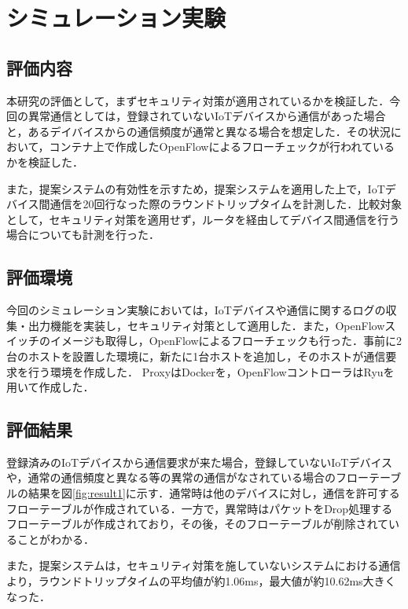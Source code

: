\documentclass[a4paper,10pt,twocolumn,uplatex]{jsarticle}
\begin{document}
\section{シミュレーション実験}

\subsection{評価内容}
本研究の評価として，まずセキュリティ対策が適用されているかを検証した．今回の異常通信としては，登録されていないIoTデバイスから通信があった場合と，あるデイバイスからの通信頻度が通常と異なる場合を想定した．その状況において，コンテナ上で作成したOpenFlowによるフローチェックが行われているかを検証した．\par
また，提案システムの有効性を示すため，提案システムを適用した上で，IoTデバイス間通信を20回行なった際のラウンドトリップタイムを計測した．比較対象として，セキュリティ対策を適用せず，ルータを経由してデバイス間通信を行う場合についても計測を行った．



\subsection{評価環境}
今回のシミュレーション実験においては，IoTデバイスや通信に関するログの収集・出力機能を実装し，セキュリティ対策として適用した．また，OpenFlowスイッチのイメージも取得し，OpenFlowによるフローチェックも行った．事前に2台のホストを設置した環境に，新たに1台ホストを追加し，そのホストが通信要求を行う環境を作成した．
ProxyはDockerを，OpenFlowコントローラはRyuを用いて作成した．


\subsection{評価結果}
登録済みのIoTデバイスから通信要求が来た場合，登録していないIoTデバイスや，通常の通信頻度と異なる等の異常の通信がなされている場合のフローテーブルの結果を図\ref{fig:result1}に示す．通常時は他のデバイスに対し，通信を許可するフローテーブルが作成されている．一方で，異常時はパケットをDrop処理するフローテーブルが作成されており，その後，そのフローテーブルが削除されていることがわかる．\par
また，提案システムは，セキュリティ対策を施していないシステムにおける通信より，ラウンドトリップタイムの平均値が約1.06ms，最大値が約10.62ms大きくなった．
\end{document}
